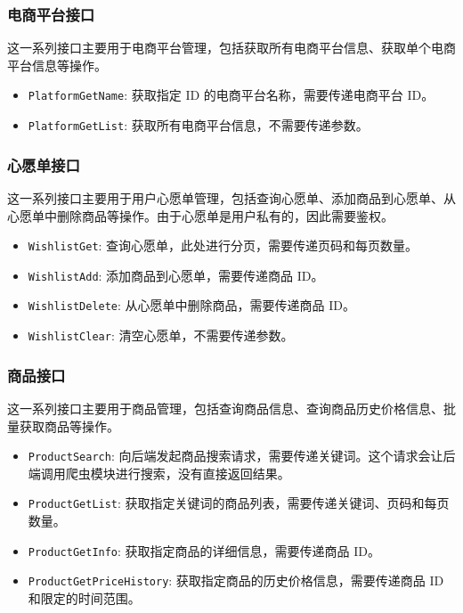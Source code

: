 \subsubsection{电商平台接口}

这一系列接口主要用于电商平台管理，包括获取所有电商平台信息、获取单个电商平台信息等操作。

\begin{itemize}
  \item \texttt{PlatformGetName}: 获取指定 ID 的电商平台名称，需要传递电商平台 ID。
  \item \texttt{PlatformGetList}: 获取所有电商平台信息，不需要传递参数。
\end{itemize}

\subsubsection{心愿单接口}

这一系列接口主要用于用户心愿单管理，包括查询心愿单、添加商品到心愿单、从心愿单中删除商品等操作。由于心愿单是用户私有的，因此需要鉴权。

\begin{itemize}
  \item \texttt{WishlistGet}: 查询心愿单，此处进行分页，需要传递页码和每页数量。
  \item \texttt{WishlistAdd}: 添加商品到心愿单，需要传递商品 ID。
  \item \texttt{WishlistDelete}: 从心愿单中删除商品，需要传递商品 ID。
  \item \texttt{WishlistClear}: 清空心愿单，不需要传递参数。
\end{itemize}

\subsubsection{商品接口}

这一系列接口主要用于商品管理，包括查询商品信息、查询商品历史价格信息、批量获取商品等操作。

\begin{itemize}
  \item \texttt{ProductSearch}: 向后端发起商品搜索请求，需要传递关键词。这个请求会让后端调用爬虫模块进行搜索，没有直接返回结果。
  \item \texttt{ProductGetList}: 获取指定关键词的商品列表，需要传递关键词、页码和每页数量。
  \item \texttt{ProductGetInfo}: 获取指定商品的详细信息，需要传递商品 ID。
  \item \texttt{ProductGetPriceHistory}: 获取指定商品的历史价格信息，需要传递商品 ID 和限定的时间范围。
\end{itemize}

